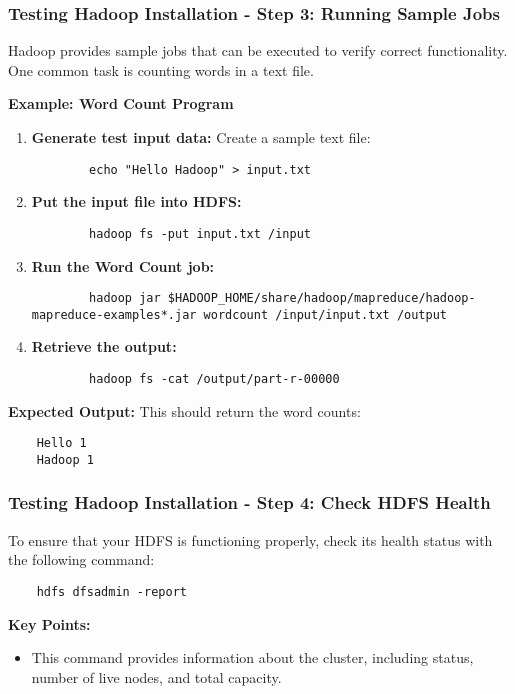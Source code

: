 \documentclass{beamer}
\begin{document}
\begin{frame}[fragile]
    \frametitle{Testing Hadoop Installation - Step 3: Running Sample Jobs}
    Hadoop provides sample jobs that can be executed to verify correct functionality. One common task is counting words in a text file.

    \textbf{Example: Word Count Program}
    \begin{enumerate}
        \item \textbf{Generate test input data:}
        Create a sample text file:
        \begin{lstlisting}
        echo "Hello Hadoop" > input.txt
        \end{lstlisting}

        \item \textbf{Put the input file into HDFS:}
        \begin{lstlisting}
        hadoop fs -put input.txt /input
        \end{lstlisting}

        \item \textbf{Run the Word Count job:}
        \begin{lstlisting}
        hadoop jar $HADOOP_HOME/share/hadoop/mapreduce/hadoop-mapreduce-examples*.jar wordcount /input/input.txt /output
        \end{lstlisting}

        \item \textbf{Retrieve the output:}
        \begin{lstlisting}
        hadoop fs -cat /output/part-r-00000
        \end{lstlisting}
    \end{enumerate}

    \textbf{Expected Output:}
    This should return the word counts:
    \begin{lstlisting}
    Hello 1
    Hadoop 1
    \end{lstlisting}
\end{frame}

\begin{frame}[fragile]
    \frametitle{Testing Hadoop Installation - Step 4: Check HDFS Health}
    To ensure that your HDFS is functioning properly, check its health status with the following command:

    \begin{lstlisting}
    hdfs dfsadmin -report
    \end{lstlisting}

    \textbf{Key Points:}
    \begin{itemize}
        \item This command provides information about the cluster, including status, number of live nodes, and total capacity.
    \end{itemize}
\end{frame}
\end{document}
